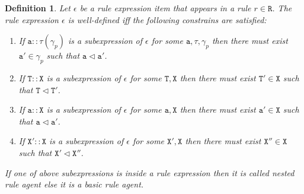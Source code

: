 \documentclass[12pt]{article}
\newtheorem{mydef}{Definition}
\begin{document}
\begin{mydef}
Let $\epsilon$ be a rule expression item that appears in a rule $r\in\mathtt{R}$. The \emph{rule expression} $\epsilon$ is \emph{well-defined} iff the following constrains are satisfied:

\begin{enumerate}
 \item If $\mathtt{a}::\tau(\gamma_p)$ is a subexpression of $\epsilon$ for some $\mathtt{a},\tau,\gamma_p$ then there must exist $\mathtt{a}' \in \gamma_p$ such that $\mathtt{a} \lhd \mathtt{a}'$.

\item If $\mathtt{T}::\mathtt{X}$ is a subexpression of $\epsilon$ for some $\mathtt{T},\mathtt{X}$ then there must exist $\mathtt{T}' \in \mathtt{X}$ such that $\mathtt{T} \lhd \mathtt{T}'$.

\item If $\mathtt{a}::\mathtt{X}$ is a subexpression of $\epsilon$ for some $\mathtt{a},\mathtt{X}$ then there must exist $\mathtt{a}' \in \mathtt{X}$ such that $\mathtt{a} \lhd \mathtt{a}'$.

\item If $\mathtt{X}'::\mathtt{X}$ is a subexpression of $\epsilon$ for some $\mathtt{X}',\mathtt{X}$ then there must exist $\mathtt{X}'' \in \mathtt{X}$ such that $\mathtt{X}' \lhd \mathtt{X}''$.

\end{enumerate}
 
If one of above subexpressions is inside a rule expression then it is called \emph{nested} rule agent else it is a \emph{basic} rule agent.
\end{mydef}
\end{document}
